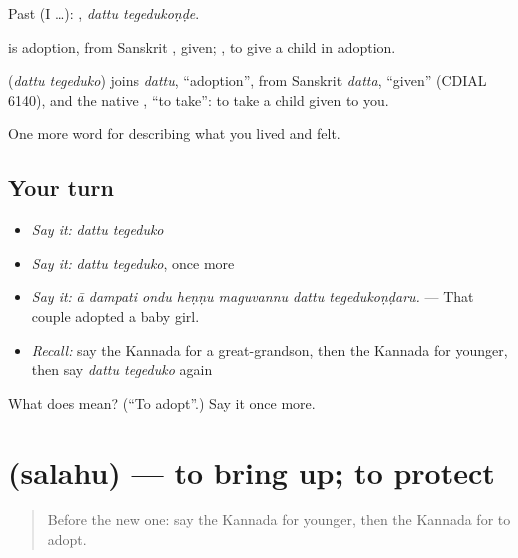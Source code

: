 Past (I …):  , \emph{dattu tegedukoṇḍe}.

 is adoption, from Sanskrit , given;  , to give a child in adoption.

\begin{cousinweb}
\textbf{ } (\emph{dattu tegeduko}) joins \emph{dattu}, \textquotedblleft{}adoption\textquotedblright{}, from Sanskrit \emph{datta}, \textquotedblleft{}given\textquotedblright{} (CDIAL 6140), and the native , \textquotedblleft{}to take\textquotedblright{}: to take a child given to you.
\end{cousinweb}

\begin{grammarlens}[title={What you've built}]
One more word for describing what you lived and felt.
\end{grammarlens}

\subsection*{Your turn}
\begin{itemize}
\raggedright
  \item \emph{Say it:} \emph{dattu tegeduko}
  \item \emph{Say it:} \emph{dattu tegeduko}, once more
  \item \emph{Say it:} \emph{ā dampati ondu heṇṇu maguvannu dattu tegedukoṇḍaru.} — That couple adopted a baby girl.
  \item \emph{Recall:} say the Kannada for a great-grandson, then the Kannada for younger, then say \emph{dattu tegeduko} again
\end{itemize}

\begin{tcolorbox}[breakable,colback=teal!4,colframe=teal!35!black,title={Before you move on}]
What does   mean? (\textquotedblleft{}To adopt\textquotedblright{}.) Say it once more.
\end{tcolorbox}
\section[\texorpdfstring{\kn{ಸಲಹು} (salahu)}{ಸಲಹು (salahu)}]{ (salahu) — to bring up; to protect}

\label{lesson:KA-C527-salahu}



\begin{quote}
Before the new one: say the Kannada for younger, then the Kannada for to adopt.
\end{quote}

